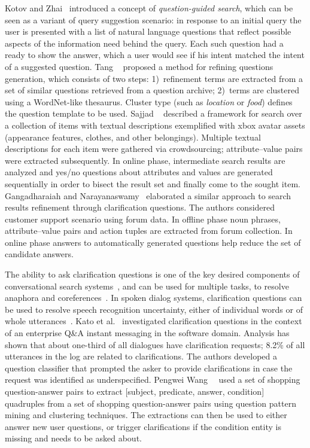 Kotov and Zhai~\cite{kotov2010} introduced a concept of \textit{question-guided search}, which can be seen as a variant of query suggestion scenario: in response to an initial query the user is presented with a list of natural language questions that reflect possible aspects of the information need behind the query.
Each such question had a ready to show the answer, which a user would see if his intent matched the intent of a suggested question.
Tang \etal~\cite{tang2011} proposed a method for refining questions generation, which consists of two steps: 1)~refinement terms are extracted from a set of similar questions retrieved from a question archive; 2)~terms are clustered using a WordNet-like thesaurus.
Cluster type (such as \textit{location} or \textit{food}) defines the question template to be used.
Sajjad \etal~\cite{sajjad12} described a framework for search over a collection of items with textual descriptions exemplified with xbox avatar assets (appearance features, clothes, and other belongings).
Multiple textual descriptions for each item were gathered via crowdsourcing; attribute--value pairs were extracted subsequently.
In online phase, intermediate search results are analyzed and yes/no questions about attributes and values are generated sequentially in order to bisect the result set and finally come to the sought item.
Gangadharaiah and Narayanaswamy~\cite{gangadharaiah2013} elaborated a similar approach to search results refinement through clarification questions.
The authors considered customer support scenario using forum data.
In offline phase noun phrases, attribute--value pairs and action tuples are extracted from forum collection.
In online phase answers to automatically generated questions help reduce the set of candidate answers.

The ability to ask clarification questions is one of the key desired components of conversational search systems~\cite{radlinski2017}, and can be used for multiple tasks, 
\eg to resolve anaphora and coreferences~\cite{quarteroni2009}.
In spoken dialog systems, clarification questions can be used to resolve speech recognition uncertainty, either of individual words or of whole utterances~\cite{stoyanchev2013}. 
Kato et al.~\cite{kato2013} investigated clarification questions in the context of an enterprise  Q\&A instant messaging in the software domain.
Analysis has shown that about one-third of all dialogues have clarification requests; 8.2\% of all utterances in the log are related to clarifications.
The authors developed a question classifier that prompted the asker to provide clarifications in case the request was identified as underspecified. 
Pengwei Wang~\etal~\cite{wang2016learning} used a set of shopping question-answer pairs to extract [subject, predicate, answer, condition] quadruples from a set of shopping question-answer pairs using question pattern mining and clustering techniques.
The extractions can then be used to either answer new user questions, or trigger clarifications if the condition entity is missing and needs to be asked about.

